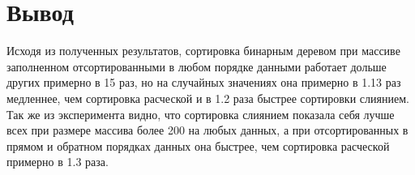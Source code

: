 \section*{Вывод}
Исходя из полученных результатов, сортировка бинарным деревом при массиве заполненном отсортированными в любом порядке данными работает дольше других примерно в 15 раз, но на случайных значениях она примерно в 1.13 раз медленнее, чем сортировка расческой и в 1.2 раза быстрее сортировки слиянием.
Так же из эксперимента видно, что сортировка слиянием показала себя лучше всех при размере массива более 200 на любых данных, а при отсортированных в прямом и обратном порядках данных она быстрее, чем сортировка расческой примерно в 1.3 раза.

